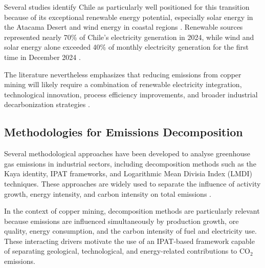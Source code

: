 Several studies identify Chile as particularly well positioned for this transition because of its exceptional renewable energy potential, especially solar energy in the Atacama Desert and wind energy in coastal regions \cite{IEAChile2026}. Renewable sources represented nearly 70\% of Chile’s electricity generation in 2024, while wind and solar energy alone exceeded 40\% of monthly electricity generation for the first time in December 2024 \cite{EnergiaEstrategica2025,Ember2025}.

The literature nevertheless emphasizes that reducing emissions from copper mining will likely require a combination of renewable electricity integration, technological innovation, process efficiency improvements, and broader industrial decarbonization strategies \cite{Memary2022}.


\subsection{Methodologies for Emissions Decomposition}

Several methodological approaches have been developed to analyse greenhouse gas emissions in industrial sectors, including decomposition methods such as the Kaya identity, IPAT frameworks, and Logarithmic Mean Divisia Index (LMDI) techniques. These approaches are widely used to separate the influence of activity growth, energy intensity, and carbon intensity on total emissions \cite{Tilton1998,Norgate2010}.

In the context of copper mining, decomposition methods are particularly relevant because emissions are influenced simultaneously by production growth, ore quality, energy consumption, and the carbon intensity of fuel and electricity use. These interacting drivers motivate the use of an IPAT-based framework capable of separating geological, technological, and energy-related contributions to CO$_2$ emissions.


